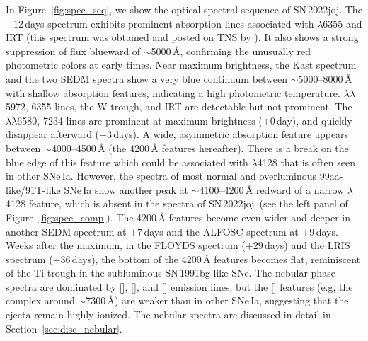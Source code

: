 \documentclass[twocolumn]{aastex631}
\newcommand{\sn}{SN\,2022joj}
\begin{document}
\begin{CJK*}{UTF8}{gbsn}
In Figure~\ref{fig:spec_seq}, we show the optical spectral sequence of \sn. The $-12$\,days spectrum exhibits prominent absorption lines associated with  $\lambda$6355 and  IRT (this spectrum was obtained and posted on TNS by \citealt{Newsome_2022TNSCR}). It also shows a strong suppression of flux blueward of $\sim$5000\,\r{A}, confirming the unusually red photometric colors at early times. Near maximum brightness, the Kast spectrum and the two SEDM spectra show a very blue continuum between $\sim$5000--8000\,\r{A} with shallow absorption features, indicating a high photometric temperature.  $\lambda\lambda$5972, 6355 lines, the  W-trough, and  IRT are detectable but not prominent. The  $\lambda\lambda$6580, 7234 lines are prominent at maximum brightness ($+0$\,day), and quickly disappear afterward ($+3$\,days). A wide, asymmetric absorption feature appears between $\sim$4000--4500\,\r{A} (the 4200\,\r{A} features hereafter). There is a break on the blue edge of this feature which could be associated with  $\lambda$4128 that is often seen in other SNe\,Ia. However, the spectra of most normal and overluminous 99aa-like/91T-like SNe\,Ia show another peak at $\sim$4100--4200\,\r{A} redward of a narrow  $\lambda$4128 feature, which is absent in the spectra of \sn\ (see the left panel of Figure~\ref{fig:spec_comp}). The 4200\,\r{A} features become even wider and deeper in another SEDM spectrum at $+7$\,days and the ALFOSC spectrum at $+9$\,days. Weeks after the maximum, in the FLOYDS spectrum ($+29$\,days) and the LRIS spectrum ($+36$\,days), the bottom of the 4200\,\r{A} features becomes flat, reminiscent of the Ti-trough in the subluminous SN\,1991bg-like \citep[91bg-like;][]{Filippenko_91bg_1992,Leibundgut_91bg_1993} SNe. The nebular-phase spectra are dominated by [], [], and [] emission lines, but the [] features (e.g, the complex around $\sim$7300\,\r{A}) are weaker than in other SNe\,Ia, suggesting that the ejecta remain highly ionized. The nebular spectra are discussed in detail in Section~\ref{sec:disc_nebular}.


\end{CJK*}
\end{document}
